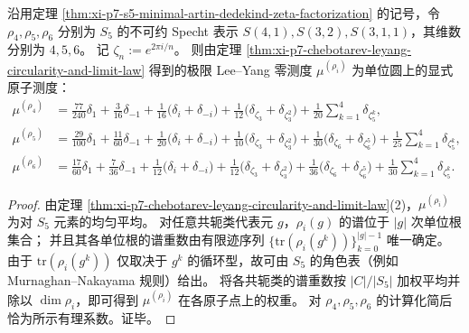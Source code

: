 \begin{theorem}[\texorpdfstring{$(L/\QQ,G\cong S_5)$}{(L/Q,G=S5)} 的三条非平凡通道之 Lee--Yang 谱测度闭式]\label{thm:xi-p7-s5-langlands-channels-leyang-measures}
沿用定理 \ref{thm:xi-p7-s5-minimal-artin-dedekind-zeta-factorization} 的记号，令 \(\rho_4,\rho_5,\rho_6\) 分别为 \(S_5\) 的不可约 Specht 表示
\(
S(4,1),S(3,2),S(3,1,1)
\)，其维数分别为 \(4,5,6\)。
记 \(\zeta_n:=e^{2\pi i/n}\)。
则由定理 \ref{thm:xi-p7-chebotarev-leyang-circularity-and-limit-law} 得到的极限 Lee--Yang 零测度 \(\mu^{(\rho_i)}\) 为单位圆上的显式原子测度：
\[
\boxed{\begin{aligned}
\mu^{(\rho_4)}
&=\frac{77}{240}\delta_{1}+\frac{3}{16}\delta_{-1}
+\frac{1}{16}\bigl(\delta_{i}+\delta_{-i}\bigr)
+\frac{1}{12}\bigl(\delta_{\zeta_3}+\delta_{\zeta_3^2}\bigr)
+\frac{1}{20}\sum_{k=1}^4\delta_{\zeta_5^k},\\[2mm]
\mu^{(\rho_5)}
&=\frac{29}{100}\delta_{1}+\frac{11}{60}\delta_{-1}
+\frac{1}{20}\bigl(\delta_{i}+\delta_{-i}\bigr)
+\frac{1}{10}\bigl(\delta_{\zeta_3}+\delta_{\zeta_3^2}\bigr)
+\frac{1}{30}\bigl(\delta_{\zeta_6}+\delta_{\zeta_6^5}\bigr)
+\frac{1}{25}\sum_{k=1}^4\delta_{\zeta_5^k},\\[2mm]
\mu^{(\rho_6)}
&=\frac{17}{60}\delta_{1}+\frac{7}{36}\delta_{-1}
+\frac{1}{12}\bigl(\delta_{i}+\delta_{-i}\bigr)
+\frac{1}{12}\bigl(\delta_{\zeta_3}+\delta_{\zeta_3^2}\bigr)
+\frac{1}{36}\bigl(\delta_{\zeta_6}+\delta_{\zeta_6^5}\bigr)
+\frac{1}{30}\sum_{k=1}^4\delta_{\zeta_5^k}.
\end{aligned}}
\]
\end{theorem}
\begin{proof}
由定理 \ref{thm:xi-p7-chebotarev-leyang-circularity-and-limit-law}(2)，\(\mu^{(\rho_i)}\) 为对 \(S_5\) 元素的均匀平均。
对任意共轭类代表元 \(g\)，\(\rho_i(g)\) 的谱位于 \(|g|\) 次单位根集合；
并且其各单位根的谱重数由有限迹序列
\(
\{\mathrm{tr}(\rho_i(g^k))\}_{k=0}^{|g|-1}
\)
唯一确定。
由于 \(\mathrm{tr}(\rho_i(g^k))\) 仅取决于 \(g^k\) 的循环型，故可由 \(S_5\) 的角色表（例如 Murnaghan--Nakayama 规则）给出。
将各共轭类的谱重数按 \(|C|/|S_5|\) 加权平均并除以 \(\dim\rho_i\)，即可得到 \(\mu^{(\rho_i)}\) 在各原子点上的权重。
对 \(\rho_4,\rho_5,\rho_6\) 的计算化简后恰为所示有理系数。证毕。
\end{proof}

